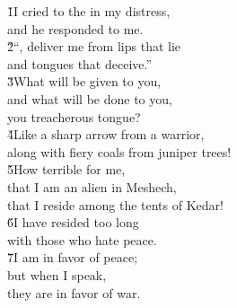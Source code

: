 \begin{poetry}
\poeml \v{1}I cried to the  in my distress, \\
\poemll    and he responded to me. \\
\poeml \v{2}``, deliver me from lips that lie \\
\poemll    and tongues that deceive.'' \\
\poeml \v{3}What will be given to you, \\
\poemll    and what will be done to you, \\
\poemlll       you treacherous tongue? \\
\poeml \v{4}Like a sharp arrow from a warrior, \\
\poemll    along with fiery coals from juniper trees! \\
\poeml \v{5}How terrible for me, \\
\poemll    that I am an alien in Meshech, \\
\poemlll       that I reside among the tents of Kedar! \\
\poeml \v{6}I have resided too long \\
\poemll    with those who hate peace. \\
\poeml \v{7}I am in favor of peace; \\
\poemll    but when I speak, \\
\poemlll       they are in favor of war.
\end{poetry}

